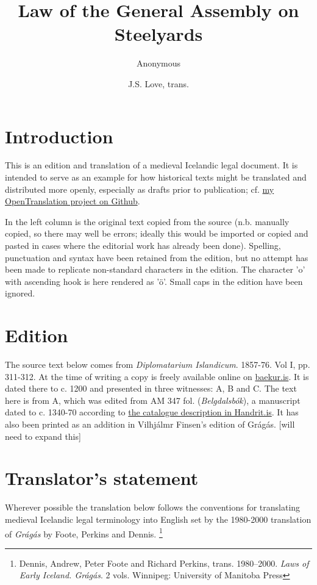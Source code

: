 \documentclass[12pt]{article}
\title{Law of the General Assembly on Steelyards}
\author{
Anonymous\\
\and
J.S. Love, trans.}
\begin{document}
\maketitle


\section*{Introduction}

This is an edition and translation of a medieval Icelandic legal document. It
is intended to serve as an example for how historical texts might be translated
and distributed more openly, especially as drafts prior to
publication; cf. \href{https://github.com/ThorkellMoon/OpenTranslation}{my OpenTranslation project on Github}.
\par
In the left column is the original text copied from the source (n.b. manually
copied, so there may well be errors; ideally this would be imported or copied
and pasted in cases where the editorial work has already been done). Spelling, punctuation and syntax have been retained from the edition, but no attempt has been made to replicate non-standard characters in the edition. The character 'o' with ascending hook is here rendered as 'ö'. Small caps in the edition have been ignored.

\section*{Edition}
The source text below comes from \textit{Diplomatarium Islandicum}. 1857-76. Vol I, pp. 311-312.
At the time of writing a copy is freely available online on \href{https://baekur.is/bok/000197700/DiplomatariumIslandicum}{baekur.is}.
It is dated there to c. 1200 and presented in three witnesses: A, B and C. The
text here is from A, which was edited from AM 347 fol. (\textit{Belgdalsbók}), a manuscript
dated to c. 1340-70 according to \href{https://handrit.is/en/manuscript/view/is/AM02-0347}{the catalogue description in Handrit.is}.
It has also been printed as an addition in Vilhjálmr Finsen's edition of
Grágás. [will need to expand this]

\section*{Translator's statement}
Wherever possible the translation below follows the conventions for translating medieval Icelandic
legal terminology into English set by the 1980-2000 translation of \textit{Grágás} by Foote, Perkins and Dennis. \footnote{Dennis, Andrew, Peter Foote and Richard Perkins, trans. 1980–2000. \textit{Laws of Early Iceland. Grágás}. 2 vols. Winnipeg: University of Manitoba Press}
\end{document}
